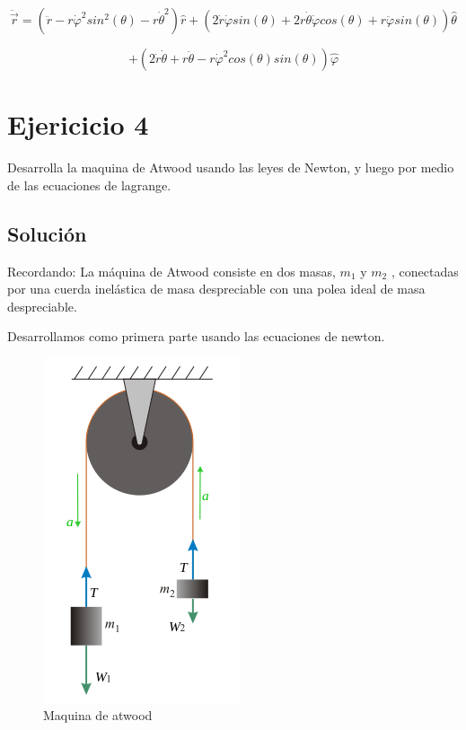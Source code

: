 \documentclass[12 pt]{article}
\begin{document}
 \begin{equation*}
 \ddot{\vec{r}} =  \left( \ddot{r} - r \dot{\varphi}^{2} sin^{2}(\theta) -  r \dot{\theta}^{2} \right) \hat{r} 
 + \left(2 \dot{r}\dot{\varphi}sin(\theta)+ 2 r \dot{\theta}\dot{\varphi}cos(\theta) + r \ddot{\varphi} sin(\theta)\right) \hat{\theta} 
 \end{equation*}

 \begin{equation*}
 +\left(  2 \dot{r}\dot{\theta} + r \ddot{\theta} - r \dot{\varphi}^{2} cos(\theta)sin(\theta) \right) \hat{\varphi} 
 \end{equation*}



\section*{Ejericicio 4}
Desarrolla la maquina de Atwood usando las leyes de Newton, y luego por medio de las ecuaciones de lagrange.


\subsection*{Solución}
Recordando: La máquina de Atwood consiste en dos masas, $ m_{1}$ y  $m_{2}$ , conectadas por una cuerda inelástica de masa despreciable con una polea ideal de masa despreciable.


Desarrollamos como primera parte usando las ecuaciones de newton. 

\begin{figure}[H]
	\centering
	\includegraphics[scale= 0.5]{imagenes/a1.png}
	\caption{Maquina de atwood}
	\label{atwood}
\end{figure}
\end{document}
